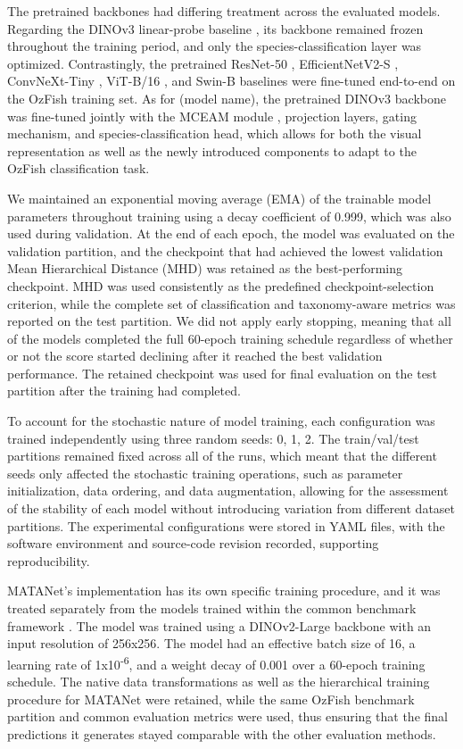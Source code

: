 \documentclass[preprint,12pt]{elsarticle}
\begin{document}
The pretrained backbones had differing treatment across the evaluated
models. Regarding the DINOv3 linear-probe baseline
\cite{ref25}, its backbone remained frozen
throughout the training period, and only the species-classification
layer was optimized. Contrastingly, the pretrained ResNet-50
\cite{ref39}, EfficientNetV2-S
\cite{ref40}, ConvNeXt-Tiny
\cite{ref41}, ViT-B/16
\cite{ref36}, and Swin-B
\cite{ref38} baselines were fine-tuned
end-to-end on the OzFish training set. As for (model name), the
pretrained DINOv3 backbone \cite{ref25} was
fine-tuned jointly with the MCEAM module
\cite{ref26}, projection layers, gating
mechanism, and species-classification head, which allows for both the
visual representation as well as the newly introduced components to
adapt to the OzFish classification task.

We maintained an exponential moving average (EMA) of the trainable model
parameters throughout training using a decay coefficient of 0.999, which
was also used during validation. At the end of each epoch, the model was
evaluated on the validation partition, and the checkpoint that had
achieved the lowest validation Mean Hierarchical Distance (MHD)
\cite{ref24}
\cite{ref30} was retained as the best-performing
checkpoint. MHD was used consistently as the predefined
checkpoint-selection criterion, while the complete set of classification
and taxonomy-aware metrics was reported on the test partition. We did
not apply early stopping, meaning that all of the models completed the
full 60-epoch training schedule regardless of whether or not the score
started declining after it reached the best validation performance. The
retained checkpoint was used for final evaluation on the test partition
after the training had completed.

To account for the stochastic nature of model training, each
configuration was trained independently using three random seeds: 0, 1,
2. The train/val/test partitions remained fixed across all of the runs,
which meant that the different seeds only affected the stochastic
training operations, such as parameter initialization, data ordering,
and data augmentation, allowing for the assessment of the stability of
each model without introducing variation from different dataset
partitions. The experimental configurations were stored in YAML files,
with the software environment and source-code revision recorded,
supporting reproducibility.

MATANet's implementation has its own specific training procedure, and it
was treated separately from the models trained within the common
benchmark framework \cite{ref26}. The model was
trained using a DINOv2-Large backbone
\cite{ref47} with an input resolution of
256x256. The model had an effective batch size of 16, a learning rate of
1x10\textsuperscript{-6}, and a weight decay of 0.001 over a 60-epoch
training schedule. The native data transformations as well as the
hierarchical training procedure for MATANet were retained, while the
same OzFish benchmark partition and common evaluation metrics were used,
thus ensuring that the final predictions it generates stayed comparable
with the other evaluation methods.
\end{document}
